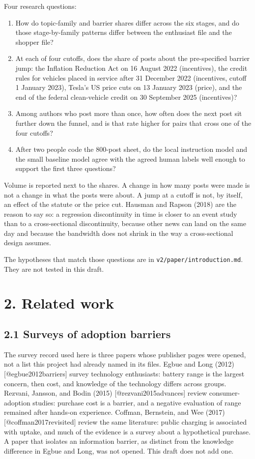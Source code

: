 \documentclass[11pt]{article}
\begin{document}
Four research questions:


\begin{enumerate}
\item How do topic-family and barrier shares differ across the six stages, and do those stage-by-family patterns differ between the enthusiast file and the shopper file?
\item At each of four cutoffs, does the share of posts about the pre-specified barrier jump: the Inflation Reduction Act on 16 August 2022 (incentives), the credit rules for vehicles placed in service after 31 December 2022 (incentives, cutoff 1 January 2023), Tesla's US price cuts on 13 January 2023 (price), and the end of the federal clean-vehicle credit on 30 September 2025 (incentives)?
\item Among authors who post more than once, how often does the next post sit further down the funnel, and is that rate higher for pairs that cross one of the four cutoffs?
\item After two people code the 800-post sheet, do the local instruction model and the small baseline model agree with the agreed human labels well enough to support the first three questions?
\end{enumerate}


Volume is reported next to the shares. A change in how many posts were made is not a change in what the posts were about. A jump at a cutoff is not, by itself, an effect of the statute or the price cut. Hausman and Rapson (2018) are the reason to say so: a regression discontinuity in time is closer to an event study than to a cross-sectional discontinuity, because other news can land on the same day and because the bandwidth does not shrink in the way a cross-sectional design assumes.


The hypotheses that match those questions are in \texttt{v2/paper/introduction.md}. They are not tested in this draft.


\section{2. Related work}

\subsection{2.1 Surveys of adoption barriers}

The survey record used here is three papers whose publisher pages were opened, not a list this project had already named in its files. Egbue and Long (2012) [@egbue2012barriers] survey technology enthusiasts: battery range is the largest concern, then cost, and knowledge of the technology differs across groups. Rezvani, Jansson, and Bodin (2015) [@rezvani2015advances] review consumer-adoption studies: purchase cost is a barrier, and a negative evaluation of range remained after hands-on experience. Coffman, Bernstein, and Wee (2017) [@coffman2017revisited] review the same literature: public charging is associated with uptake, and much of the evidence is a survey about a hypothetical purchase. A paper that isolates an information barrier, as distinct from the knowledge difference in Egbue and Long, was not opened. This draft does not add one.
\end{document}
